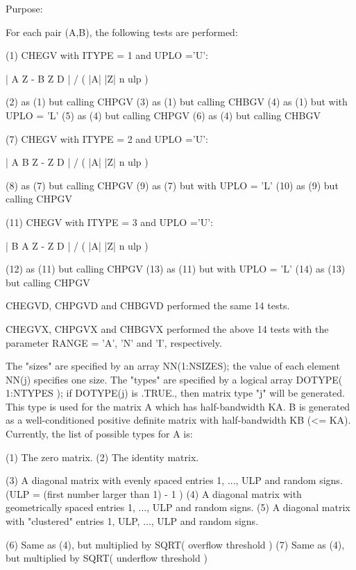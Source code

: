\begin{DoxyParagraph}{Purpose\+: }
\begin{DoxyVerb}
      For each pair (A,B), the following tests are performed:

      (1) CHEGV with ITYPE = 1 and UPLO ='U':

              | A Z - B Z D | / ( |A| |Z| n ulp )

      (2) as (1) but calling CHPGV
      (3) as (1) but calling CHBGV
      (4) as (1) but with UPLO = 'L'
      (5) as (4) but calling CHPGV
      (6) as (4) but calling CHBGV

      (7) CHEGV with ITYPE = 2 and UPLO ='U':

              | A B Z - Z D | / ( |A| |Z| n ulp )

      (8) as (7) but calling CHPGV
      (9) as (7) but with UPLO = 'L'
      (10) as (9) but calling CHPGV

      (11) CHEGV with ITYPE = 3 and UPLO ='U':

              | B A Z - Z D | / ( |A| |Z| n ulp )

      (12) as (11) but calling CHPGV
      (13) as (11) but with UPLO = 'L'
      (14) as (13) but calling CHPGV

      CHEGVD, CHPGVD and CHBGVD performed the same 14 tests.

      CHEGVX, CHPGVX and CHBGVX performed the above 14 tests with
      the parameter RANGE = 'A', 'N' and 'I', respectively.

      The "sizes" are specified by an array NN(1:NSIZES); the value of
      each element NN(j) specifies one size.
      The "types" are specified by a logical array DOTYPE( 1:NTYPES );
      if DOTYPE(j) is .TRUE., then matrix type "j" will be generated.
      This type is used for the matrix A which has half-bandwidth KA.
      B is generated as a well-conditioned positive definite matrix
      with half-bandwidth KB (<= KA).
      Currently, the list of possible types for A is:

      (1)  The zero matrix.
      (2)  The identity matrix.

      (3)  A diagonal matrix with evenly spaced entries
           1, ..., ULP  and random signs.
           (ULP = (first number larger than 1) - 1 )
      (4)  A diagonal matrix with geometrically spaced entries
           1, ..., ULP  and random signs.
      (5)  A diagonal matrix with "clustered" entries 1, ULP, ..., ULP
           and random signs.

      (6)  Same as (4), but multiplied by SQRT( overflow threshold )
      (7)  Same as (4), but multiplied by SQRT( underflow threshold )


\end{DoxyVerb}
\end{DoxyParagraph}
